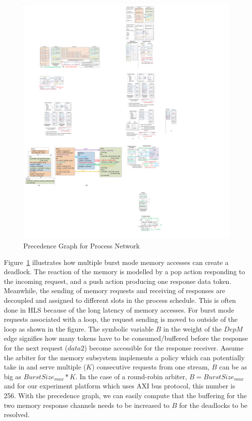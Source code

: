\documentclass{sig-alternate}
\begin{document}
\begin{figure}[htp]
\begin{center}
\includegraphics[width=1.05\linewidth]{fig/burstMem.pdf}
\caption{Precedence Graph for Process Network
\label{fig:memBurst}}
\end{center}
\vspace{-2.0em}
\end{figure}


Figure~\ref{fig:memBurst} illustrates how multiple burst mode memory accesses can
create a deadlock. The reaction of the memory is modelled by a pop action
responding to the incoming request, and a push action producing one response data token. Meanwhile, the sending of memory requests and receiving of responses are decoupled and assigned to different slots in the process schedule. This is often done in HLS because of the long latency of memory accesses.
For burst mode requests associated with a loop, the request sending is moved to outside of the loop as shown in the figure. The symbolic variable $B$ in the weight of the $DepM$ edge signifies how many tokens have to be consumed/buffered before the response for the next request ($data2$) become accessible for the response receiver. Assume the arbiter for the memory subsystem implements a policy which can potentially take in and serve multiple ($K$) consecutive requests from one stream, $B$ can be as big as $BurstSize_{max}*K$. 
In the case of a round-robin arbiter, $B = BurstSize_{max}$ and for our experiment platform which uses AXI bus protocol, this number is 256. With the precedence graph, we can easily compute that the buffering for the two memory response channels needs to be increased to $B$ for the deadlocks to be resolved.
\end{document}
